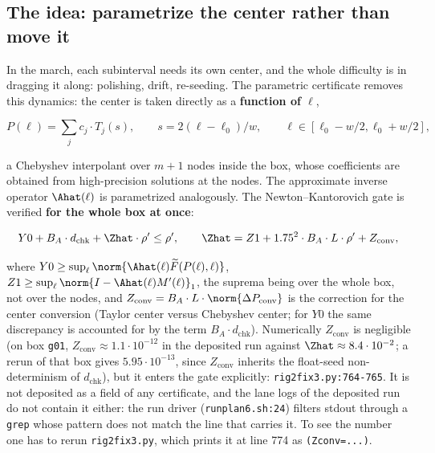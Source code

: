 \subsection{The idea: parametrize the center rather than move it}
\label{sec:3.1}

In the march, each subinterval needs its own center, and the whole difficulty is in
dragging it along: polishing, drift, re-seeding. The parametric certificate
removes this dynamics: the center is taken directly as a \textbf{function of $\ell$},

\[
P(\ell) = \sum_j c_j \cdot T_j(s), \qquad s = 2(\ell - \ell_0)/w, \qquad \ell \in [\ell_0 - w/2, \ell_0 + w/2],
\]

a Chebyshev interpolant over $m+1$ nodes inside the box, whose coefficients are
obtained from high-precision solutions at the nodes. The approximate inverse
operator $\Ahat(\ell)$ is parametrized analogously. The Newton--Kantorovich gate
is verified \textbf{for the whole box at once}:

\[
Y0 + B_A \cdot d_{\mathrm{chk}} + \Zhat \cdot \rho' \le \rho', \qquad \Zhat = Z1 + 1.75^2 \cdot B_A \cdot L \cdot \rho' + Z_{\mathrm{conv}},
\]

where $Y0 \ge \sup_\ell \norm{\Ahat(\ell) \widetilde{F}(P(\ell),\ell)}$, $Z1 \ge \sup_\ell \norm{I - \Ahat(\ell) M'(\ell)}_1$, the suprema
being over the whole box, not over the nodes, and $Z_{\mathrm{conv}} = B_A \cdot L \cdot \norm{\Delta P_{\mathrm{conv}}}$
is the correction for the center conversion (Taylor center versus Chebyshev center;
for $Y0$ the same discrepancy is accounted for by the term $B_A \cdot d_{\mathrm{chk}}$).
Numerically $Z_{\mathrm{conv}}$ is negligible (on box \texttt{g01}, $Z_{\mathrm{conv}} \approx 1.1 \cdot 10^{-12}$ in the deposited run against $\Zhat \approx 8.4 \cdot 10^{-2}$; a rerun of that box gives $5.95\cdot 10^{-13}$, since $Z_{\mathrm{conv}}$ inherits the float-seed non-determinism of $d_{\mathrm{chk}}$), but it enters the gate explicitly:
\texttt{rig2fix3.py:764-765}. It is not deposited as a field of any certificate, and the lane logs of the
deposited run do not contain it either: the run driver
(\texttt{runplan6.sh:24}) filters stdout through a \texttt{grep} whose
pattern does not match the line that carries it. To see the number one has
to rerun \texttt{rig2fix3.py}, which prints it at line 774 as
\texttt{(Zconv=...)}.

